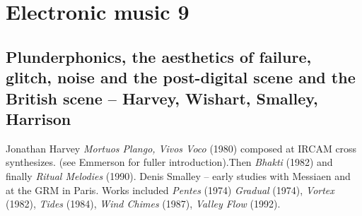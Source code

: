 
\chapter{Electronic music 9}
\label{history9}

\section{Plunderphonics, the aesthetics of failure, glitch, noise and the post-digital scene and the British scene – Harvey, Wishart, Smalley, Harrison}


Jonathan Harvey \textit{Mortuos Plango, Vivos Voco} (1980) composed at IRCAM cross synthesizes. (see Emmerson for fuller introduction).Then \textit{Bhakti} (1982) and finally \textit{Ritual Melodies} (1990). 
Denis Smalley – early studies with Messiaen and at the GRM in Paris. Works included \textit{Pentes} (1974) \textit{Gradual} (1974), \textit{Vortex} (1982), \textit{Tides} (1984), \textit{Wind Chimes} (1987), \textit{Valley Flow} (1992).

